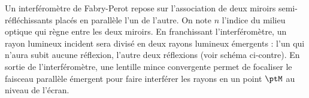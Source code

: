 
\finEntrainement




\hauteurLargeurCadreReponse		{8mm}{2.0cm}
\initialisationEntrainement


                                \initialisationPartieGauche %
Un interféromètre de Fabry-Perot repose sur l'association de deux miroirs semi-réfléchissants placés en parallèle l'un de l'autre. On note $n$ l'indice du milieu optique qui règne entre les deux miroirs. En franchissant l'interféromètre, un rayon lumineux incident sera divisé en deux rayons lumineux émergents : l'un qui n'aura subit aucune réflexion, l'autre deux réflexions (voir schéma ci-contre). En sortie de l'interféromètre, une lentille mince convergente permet de focaliser le faisceau parallèle émergent pour faire interférer les rayons en un point $\ptM$ au niveau de l'écran.

